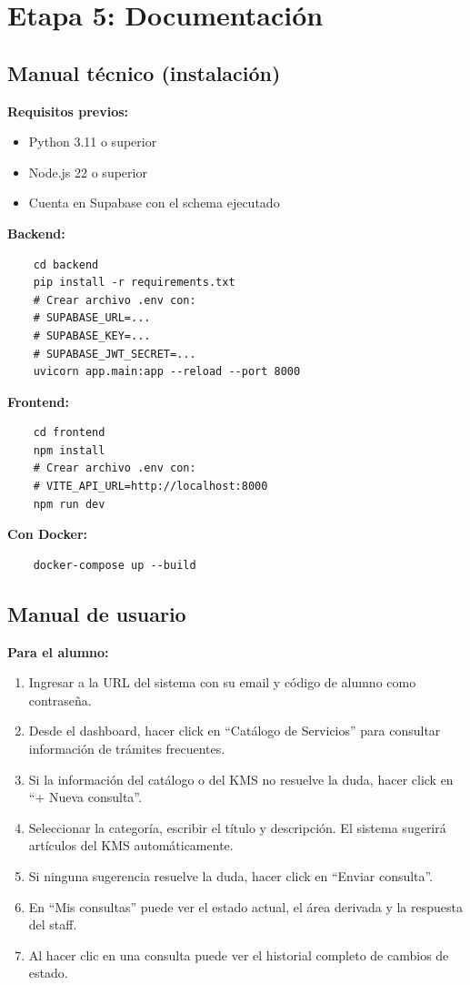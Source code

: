 \documentclass[12pt,a4paper]{article}
\begin{document}
	\newpage

	\section{Etapa 5: Documentación}

	\subsection{Manual técnico (instalación)}

	\textbf{Requisitos previos:}
	\begin{itemize}
	\setlength{\itemindent}{1cm}
	\item Python 3.11 o superior
	\item Node.js 22 o superior
	\item Cuenta en Supabase con el schema ejecutado
	\end{itemize}

	\textbf{Backend:}
	\begin{verbatim}
	cd backend
	pip install -r requirements.txt
	# Crear archivo .env con:
	# SUPABASE_URL=...
	# SUPABASE_KEY=...
	# SUPABASE_JWT_SECRET=...
	uvicorn app.main:app --reload --port 8000
	\end{verbatim}

	\textbf{Frontend:}
	\begin{verbatim}
	cd frontend
	npm install
	# Crear archivo .env con:
	# VITE_API_URL=http://localhost:8000
	npm run dev
	\end{verbatim}

	\textbf{Con Docker:}
	\begin{verbatim}
	docker-compose up --build
	\end{verbatim}

	\subsection{Manual de usuario}

	\textbf{Para el alumno:}
	\begin{enumerate}
	\setlength{\itemindent}{1cm}
	\item Ingresar a la URL del sistema con su email y código de alumno como contraseña.
	\item Desde el dashboard, hacer click en ``Catálogo de Servicios'' para consultar información de trámites frecuentes.
	\item Si la información del catálogo o del KMS no resuelve la duda, hacer click en ``+ Nueva consulta''.
	\item Seleccionar la categoría, escribir el título y descripción. El sistema sugerirá artículos del KMS automáticamente.
	\item Si ninguna sugerencia resuelve la duda, hacer click en ``Enviar consulta''.
	\item En ``Mis consultas'' puede ver el estado actual, el área derivada y la respuesta del staff.
	\item Al hacer clic en una consulta puede ver el historial completo de cambios de estado.
	\end{enumerate}
\end{document}
